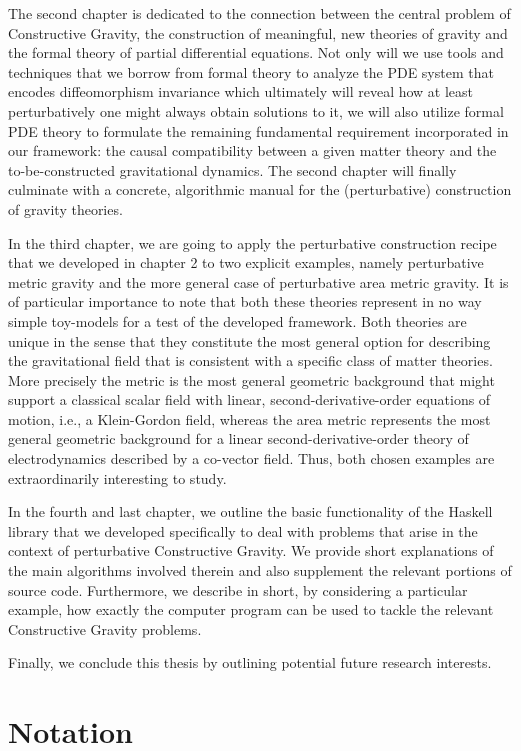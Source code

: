 The second chapter is dedicated to the connection between the central problem of Constructive Gravity, the construction of meaningful, new theories of gravity and the formal theory of partial differential equations. Not only will we use tools and techniques that we borrow from formal theory to analyze the PDE system that encodes diffeomorphism invariance which ultimately will reveal how at least perturbatively one might always obtain solutions to it, we will also utilize formal PDE theory to formulate the remaining fundamental requirement incorporated in our framework: the causal compatibility between a given matter theory and the to-be-constructed gravitational dynamics. The second chapter will finally culminate with a concrete, algorithmic manual for the (perturbative) construction of gravity theories.  

In the third chapter, we are going to apply the perturbative construction recipe that we developed in chapter 2 to two explicit examples, namely perturbative metric gravity and the more general case of perturbative area metric gravity. It is of particular importance to note that both these theories represent in no way simple toy-models for a test of the developed framework. Both theories are unique in the sense that they constitute the most general option for describing the gravitational field that is consistent with a specific class of matter theories. More precisely the metric is the most general geometric background that might support a classical scalar field with linear, second-derivative-order equations of motion, i.e., a Klein-Gordon field, whereas the area metric represents the most general geometric background for a linear second-derivative-order theory of electrodynamics described by a co-vector field. Thus, both chosen examples are extraordinarily interesting to study.

In the fourth and last chapter, we outline the basic functionality of the Haskell library that we developed specifically to deal with problems that arise in the context of perturbative Constructive Gravity. We provide short explanations of the main algorithms involved therein and also supplement the relevant portions of source code. Furthermore, we describe in short, by considering a particular example, how exactly the computer program can be used to tackle the relevant Constructive Gravity problems.

Finally, we conclude this thesis by outlining potential future research interests.

\section*{Notation}

